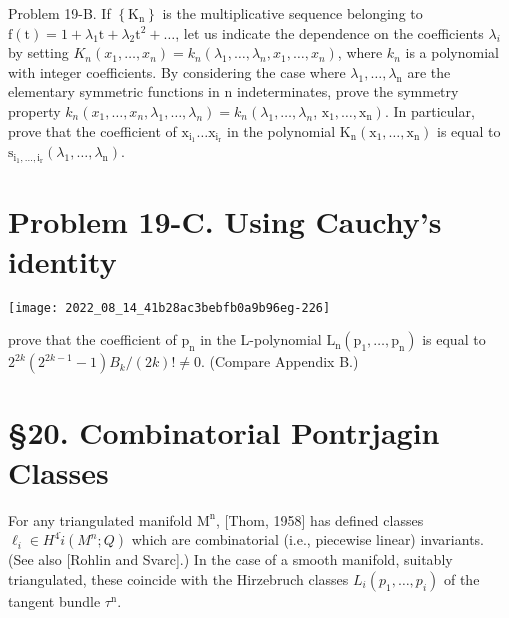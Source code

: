 \documentclass[10pt]{article}
\begin{document}
Problem 19-B. If $\left\{\mathrm{K}_{\mathrm{n}}\right\}$ is the multiplicative sequence belonging to $\mathrm{f}(\mathrm{t})=1+\lambda_{1} \mathrm{t}+\lambda_{2} \mathrm{t}^{2}+\ldots$, let us indicate the dependence on the coefficients $\lambda_{i}$ by setting $K_{n}\left(x_{1}, \ldots, x_{n}\right)=k_{n}\left(\lambda_{1}, \ldots, \lambda_{n}, x_{1}, \ldots, x_{n}\right)$, where $k_{n}$ is a polynomial with integer coefficients. By considering the case where $\lambda_{1}, \ldots, \lambda_{\mathrm{n}}$ are the elementary symmetric functions in $\mathrm{n}$ indeterminates, prove the symmetry property $k_{n}\left(x_{1}, \ldots, x_{n}, \lambda_{1}, \ldots, \lambda_{n}\right)=k_{n}\left(\lambda_{1}, \ldots, \lambda_{n}\right.$, $\left.\mathrm{x}_{1}, \ldots, \mathrm{x}_{\mathrm{n}}\right)$. In particular, prove that the coefficient of $\mathrm{x}_{\mathrm{i}_{1}} \ldots \mathrm{x}_{\mathrm{i}_{\mathrm{r}}}$ in the polynomial $\mathrm{K}_{\mathrm{n}}\left(\mathrm{x}_{1}, \ldots, \mathrm{x}_{\mathrm{n}}\right)$ is equal to $\mathrm{s}_{\mathrm{i}_{1}, \ldots, \mathrm{i}_{\mathrm{r}}}\left(\lambda_{1}, \ldots, \lambda_{\mathrm{n}}\right)$.

\section{Problem 19-C. Using Cauchy's identity}
\texttt{[image: 2022\_08\_14\_41b28ac3bebfb0a9b96eg-226]}

prove that the coefficient of $\mathrm{p}_{\mathrm{n}}$ in the L-polynomial $\mathrm{L}_{\mathrm{n}}\left(\mathrm{p}_{1}, \ldots, \mathrm{p}_{\mathrm{n}}\right)$ is equal to $2^{2 k}\left(2^{2 k-1}-1\right) B_{k} /(2 k) ! \neq 0$. (Compare Appendix B.)

\section{§20. Combinatorial Pontrjagin Classes}
For any triangulated manifold $\mathrm{M}^{\mathrm{n}}$, [Thom, 1958] has defined classes $\ell_{i} \in H^{4} \dot{i}\left(M^{n} ; Q\right)$ which are combinatorial (i.e., piecewise linear) invariants. (See also [Rohlin and Svarc].) In the case of a smooth manifold, suitably triangulated, these coincide with the Hirzebruch classes $L_{i}\left(p_{1}, \ldots, p_{i}\right)$ of the tangent bundle $\tau^{\mathrm{n}}$.
\end{document}
